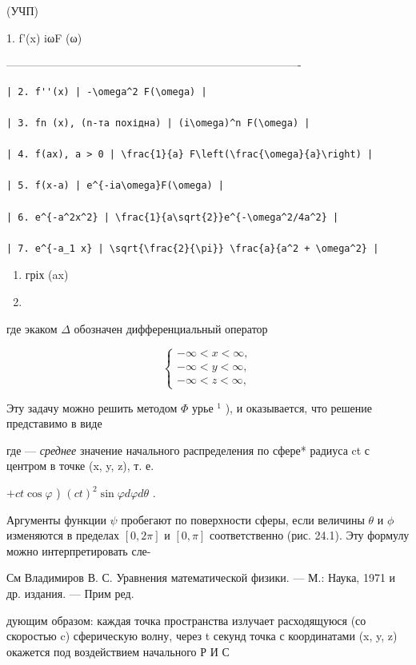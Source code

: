 \documentclass[
  ukrainian,
]{article}
\begin{document}
(УЧП)

1. f'(x) \textbar{} iωF (ω) \textbar{}

\textbar------------------------------\textbar-------------------------------------------------\textbar{}

\begin{verbatim}
| 2. f''(x) | -\omega^2 F(\omega) |

| 3. fn (x), (n-та похідна) | (i\omega)^n F(\omega) |

| 4. f(ax), a > 0 | \frac{1}{a} F\left(\frac{\omega}{a}\right) |

| 5. f(x-a) | e^{-ia\omega}F(\omega) |

| 6. e^{-a^2x^2} | \frac{1}{a\sqrt{2}}e^{-\omega^2/4a^2} |

| 7. e^{-a_1 x} | \sqrt{\frac{2}{\pi}} \frac{a}{a^2 + \omega^2} |
\end{verbatim}

\begin{enumerate}
\def\labelenumi{\arabic{enumi}.}
\setcounter{enumi}{19}
\item
  гріх (ax)
\item
\end{enumerate}

где экаком \(\Delta\) обозначен дифференциальный оператор

\[
\begin{cases} -\infty < x < \infty, \\ -\infty < y < \infty, \\ -\infty < z < \infty, \end{cases}
\]

Эту задачу можно решить методом \(\Phi\) урье \(^{1}\) ), и оказывается,
что решение представимо в виде

где \overline{\psi} --- \emph{среднее} значение начального распределения
\psi   *по сфере* радиуса ct с центром в точке (x, y, z), т. е.

\(+ ct \cos \varphi\) ) \((ct)^2 \sin \varphi d\varphi d\theta\) .

Аргументы функции \(\psi\) пробегают по поверхности сферы, если величины
\(\theta\) и \(\phi\) изменяются в пределах \([0, 2\pi]\) и \([0, \pi]\)
соответственно (рис. 24.1). Эту формулу можно интерпретировать сле-

См Владимиров В. С. Уравнения математической физики. --- М.: Наука, 1971
и др. издания. --- Прим ред.

дующим образом: каждая точка пространства излучает расходящуюся (со
скоростью c) сферическую волну, через t секунд точка с координатами (x,
y, z) окажется под воздействием начального Р И С
\end{document}
